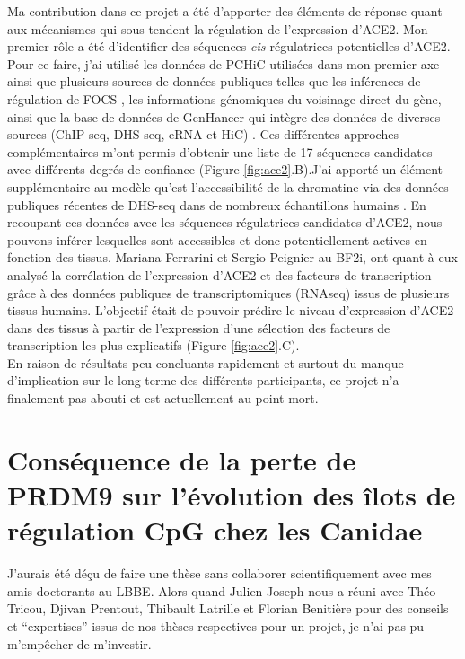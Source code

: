 Ma contribution dans ce projet a été d’apporter des éléments de réponse quant aux mécanismes qui sous-tendent la régulation de l’expression d’ACE2. Mon premier rôle a été d’identifier des séquences \textit{cis-}régulatrices potentielles d’ACE2. Pour ce faire, j’ai utilisé les données de PCHiC utilisées dans mon premier axe ainsi que plusieurs sources de données publiques telles que les inférences de régulation de FOCS \citep{hait_focs_2018}, les informations génomiques du voisinage direct du gène, ainsi que la base de données de GenHancer qui intègre des données de diverses sources (ChIP-seq, DHS-seq, eRNA et HiC) \citep{fishilevich_genehancer_2017}. Ces différentes approches complémentaires m’ont permis d’obtenir une liste de 17 séquences candidates avec différents degrés de confiance (Figure \ref{fig:ace2}.B).J’ai apporté un élément supplémentaire au modèle qu’est l’accessibilité de la chromatine via des données publiques récentes de DHS-seq dans de nombreux échantillons humains \citep{meuleman_index_2020}. En recoupant ces données avec les séquences régulatrices candidates d’ACE2, nous pouvons inférer lesquelles sont accessibles et donc potentiellement actives en fonction des tissus. Mariana Ferrarini et Sergio Peignier au BF2i, ont quant à eux analysé la corrélation de l'expression d'ACE2 et des facteurs de transcription grâce à des données publiques de transcriptomiques (RNAseq) issus de plusieurs tissus humains. L'objectif était de pouvoir prédire le niveau d'expression d'ACE2 dans des tissus à partir de l'expression d'une sélection des facteurs de transcription les plus explicatifs (Figure \ref{fig:ace2}.C). \\

En raison de résultats peu concluants rapidement et surtout du manque d'implication sur le long terme des différents participants, ce projet n’a finalement pas abouti et est actuellement au point mort.

\newpage
\section{Conséquence de la perte de PRDM9 sur l’évolution des îlots de régulation CpG chez les Canidae}
\label{annexe:canidae}

J'aurais été déçu de faire une thèse sans collaborer scientifiquement avec mes amis doctorants au LBBE. Alors quand Julien Joseph nous a réuni avec Théo Tricou, Djivan Prentout, Thibault Latrille et Florian Benitière pour des conseils et “expertises” issus de nos thèses respectives pour un projet, je n’ai pas pu m’empêcher de m’investir. \\

